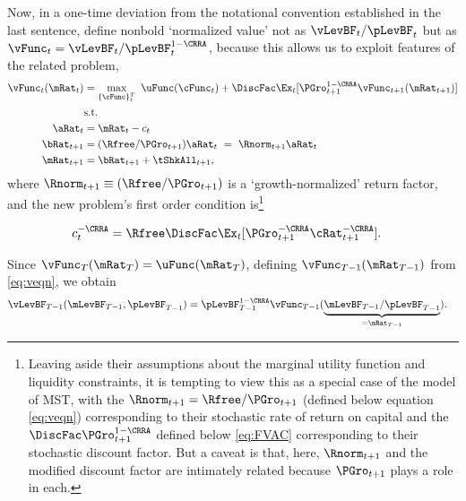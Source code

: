 \documentclass[BufferStockTheory]{subfiles}
\begin{document}
\hypertarget{The-Related-Problem}{}
Now, in a one-time deviation from the notational convention established in the last sentence, define nonbold `normalized value' not as $\vLevBF_{t}/\pLevBF_{t}$ but as $\vFunc_{t} = \vLevBF_{t}/\pLevBF_{t}^{1-\CRRA}$, because this allows us to exploit features of the related problem,
\begin{align}
  \vFunc_{t}(\mRat_{t})  & = \max_{\{\cFunc\}_{t}^{T}}~  \uFunc(\cFunc_{t}) +\DiscFac \Ex_{t}[\PGro_{t+1}^{1-\CRRA}\vFunc_{t+1}({\mRat}_{t+1})] \notag \\
                         & \mbox{s.t.}  \label{eq:veqn} 
  \\ {\aRat}_{t}  & = \mRat_{t}-c_{t}  \notag
  \\ {\bRat}_{t+1}  & = (\Rfree/\PGro_{t+1})\aRat_{t}  ~ = ~ \Rnorm_{t+1}\aRat_{t}  \notag
  \\ \mRat_{t+1}  & = \bRat_{t+1}+\tShkAll_{t+1}  \notag, %
\end{align}
where $\Rnorm_{t+1}\equiv (\Rfree/\PGro_{t+1})$ is a `growth-normalized' return factor, and the new problem's first order condition is\footnote{Leaving aside their assumptions about the marginal utility function and liquidity constraints, it is tempting to view this as a special case of the model of MST, with the $\Rnorm_{t+1}=\Rfree/\PGro_{t+1}$ (defined below equation \eqref{eq:veqn}) corresponding to their stochastic rate of return on capital and the {\FVAF} $\DiscFac \PGro_{t+1}^{1-\CRRA}$ defined below \eqref{eq:FVAC} corresponding to their stochastic discount factor.  But a caveat is that, here, $\Rnorm_{t+1}$ and the modified discount factor are intimately related because $\PGro_{t+1}$ plays a role in each.}

\begin{align}
  c_{t}^{-\CRRA}  & = \Rfree \DiscFac \Ex_{t}[ {\PGro}_{t+1}^{-\CRRA} {\cRat}
                    _{t+1}^{-\CRRA}].  \label{eq:scaledeuler}
\end{align}

Since $\vFunc_{T}(\mRat_{T}) = \uFunc(\mRat_{T})$, defining $\vFunc_{T-1}(\mRat_{T-1})$ from \eqref{eq:veqn}, we obtain
\begin{align*}
  \vLevBF_{T-1}(\mLevBF_{T-1},\pLevBF_{T-1})  & = \pLevBF_{T-1}^{1-\CRRA} \vFunc_{T-1}(\underbrace{\mLevBF_{T-1}/\pLevBF_{T-1}}_{=\mRat_{T-1}}).
\end{align*}
\end{document}
